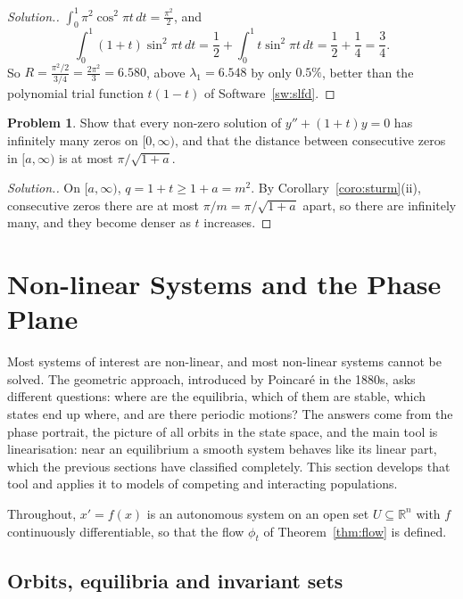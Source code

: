 \documentclass[11pt,a4paper]{article}
\numberwithin{equation}{section}
\theoremstyle{definition}
\newtheorem{problemx}{Problem}[subsection]
\newenvironment{problem}{\begin{problemx}}{\end{problemx}}
\newenvironment{solution}
  {\renewcommand{\qedsymbol}{}\begin{proof}[\textit{Solution}.]}
  {\end{proof}}
\begin{document}
\begin{solution}
$\int_0^1\pi^2\cos^2\pi t\,dt = \frac{\pi^2}{2}$, and
\[
\int_0^1(1 + t)\sin^2\pi t\,dt = \frac12 + \int_0^1t\sin^2\pi t\,dt = \frac12 + \frac14 = \frac34 .
\]
So $R = \frac{\pi^2/2}{3/4} = \frac{2\pi^2}{3} = 6.580$, above $\lambda_1 = 6.548$ by only $0.5\%$, better
than the polynomial trial function $t(1 - t)$ of Software~\ref{sw:slfd}.
\end{solution}

\begin{problem}
Show that every non-zero solution of $y'' + (1 + t)y = 0$ has infinitely many zeros on $[0, \infty)$, and that the distance between consecutive zeros in $[a, \infty)$ is at most $\pi/\sqrt{1 + a}$.
\end{problem}

\begin{solution}
On $[a, \infty)$, $q = 1 + t \geq 1 + a = m^2$. By Corollary~\ref{coro:sturm}(ii), consecutive zeros there are at most $\pi/m = \pi/\sqrt{1 + a}$ apart, so there are infinitely many, and they become denser
as $t$ increases.
\end{solution}

\section{Non-linear Systems and the Phase Plane}
\label{sec:phaseplane}

Most systems of interest are non-linear, and most non-linear systems cannot be solved. The geometric approach, introduced by Poincar\'e in the 1880s, asks
different questions: where are the equilibria, which of them are stable, which states end up where, and are there periodic motions? The answers come from
the phase portrait, the picture of all orbits in the state space, and the main tool is linearisation: near an equilibrium a smooth system behaves like
its linear part, which the previous sections have classified completely. This section develops that tool and applies it to models of competing and
interacting populations.

Throughout, $x' = f(x)$ is an autonomous system on an open set $U \subseteq \mathbb R^n$ with $f$ continuously differentiable, so that the flow $\phi_t$ of Theorem~\ref{thm:flow} is defined.

\subsection{Orbits, equilibria and invariant sets}
\label{ssec:orbits}
\end{document}
